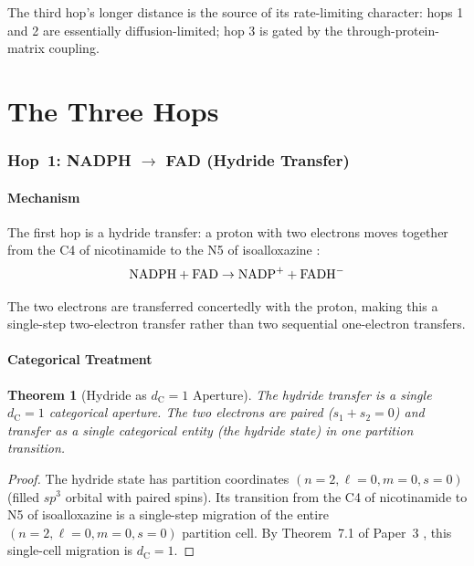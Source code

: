 \documentclass[11pt,twocolumn,a4paper]{article}
\newtheorem{theorem}{Theorem}[section]
\theoremstyle{definition}
\theoremstyle{remark}
\newcommand{\dC}{d_{\mathrm{C}}}
\begin{document}
The third hop's longer distance is the source of its rate-limiting
character: hops 1 and 2 are essentially diffusion-limited; hop 3 is
gated by the through-protein-matrix coupling.

\part{The Three Hops}

\section{Hop~1: NADPH $\to$ FAD (Hydride Transfer)}
\label{sec:hop1}

\subsection{Mechanism}

The first hop is a hydride transfer: a proton with two electrons moves
together from the C4 of nicotinamide to the N5 of isoalloxazine
\citep{murataliev2004}:
\begin{equation}
\ce{NADPH} + \ce{FAD} \to \ce{NADP^+} + \ce{FADH^-}
\label{eq:hop1}
\end{equation}

The two electrons are transferred concertedly with the proton, making
this a single-step two-electron transfer rather than two sequential
one-electron transfers.

\subsection{Categorical Treatment}

\begin{theorem}[Hydride as $\dC = 1$ Aperture]
\label{thm:hydride_dc}
The hydride transfer is a single $\dC = 1$ categorical aperture. The
two electrons are paired ($s_1 + s_2 = 0$) and transfer as a single
categorical entity (the hydride state) in one partition transition.
\end{theorem}

\begin{proof}
The hydride state has partition coordinates $(n=2, \ell=0, m=0, s=0)$
(filled $sp^3$ orbital with paired spins). Its transition from the C4
of nicotinamide to N5 of isoalloxazine is a single-step migration of
the entire $(n=2, \ell=0, m=0, s=0)$ partition cell. By Theorem~7.1 of
Paper~3 \citep{sachikonye2025_paper3}, this single-cell migration is
$\dC = 1$.
\end{proof}
\end{document}
